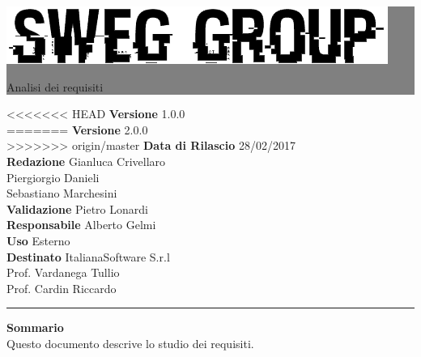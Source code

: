 \documentclass[12pt,a4paper,titlepage]{article}
\newcommand{\HRule}[1]{\hfill \rule{0.2\linewidth}{#1}} %
\begin{document}
	
	\thispagestyle{empty} %
	
	
	\colorbox{grey}{
		\parbox[t]{0.91\linewidth}{
			\centering \fontsize{50pt}{80pt}\selectfont %
			\vspace*{0.7cm} %
			
			\raggedleft
			\includegraphics[width=\linewidth]{../../LogoSWEgGroupSFONDOVUOTO}
			
			\hfill Analisi dei requisiti \\
			
			\vspace*{0.7cm} %
		}
	}
	
	
	\vfill %
	
	
	{\centering \large 
<<<<<<< HEAD
		\hfill \textbf{Versione} 			1.0.0 \\		
=======
		\hfill \textbf{Versione} 			2.0.0 \\		
>>>>>>> origin/master
		\hfill \textbf{Data di Rilascio}	28/02/2017 \\ 
		\hfill \textbf{Redazione} 			Gianluca Crivellaro \\
		\hfill								Piergiorgio Danieli \\
		\hfill								Sebastiano Marchesini \\
		\hfill \textbf{Validazione} 		Pietro Lonardi \\
		\hfill \textbf{Responsabile}		Alberto Gelmi \\
		\hfill \textbf{Uso} 				Esterno \\
		\hfill \textbf{Destinato} 			ItalianaSoftware S.r.l \\
		\hfill								Prof. Vardanega Tullio \\ 
		\hfill								Prof. Cardin Riccardo \\
		
		\HRule{1pt}
		
		\textbf{Sommario} \\
		Questo documento descrive lo studio dei requisiti.
		
	} %
	
\end{document}
